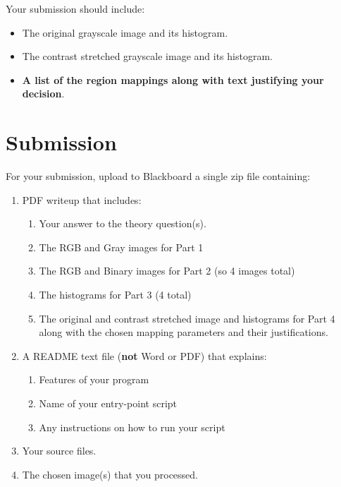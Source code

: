 \documentclass[12pt]{article}
\begin{document}
\noindent
Your submission should include:
\begin{itemize}
\item The original grayscale image and its histogram.
\item The contrast stretched grayscale image and its histogram.
\item \textbf{A list of the region mappings along with text justifying your decision}.
\end{itemize}


\newpage
\section*{Submission}
For your submission, upload to Blackboard a single zip file containing:

\begin{enumerate}
\item PDF writeup that includes:
\begin{enumerate}
\item Your answer to the theory question(s).
\item The RGB and Gray images for Part 1
\item The RGB and Binary images for Part 2 (so 4 images total)
\item The histograms for Part 3 (4 total)
\item The original and contrast stretched image and histograms for Part 4 along with the chosen mapping parameters and their justifications.
\end{enumerate}
\item A README text file (\textbf{not} Word or PDF) that explains:
\begin{enumerate}
\item Features of your program
\item Name of your entry-point script
\item Any instructions on how to run your script
\end{enumerate}
\item Your source files.
\item The chosen image(s) that you processed.
\end{enumerate}
\end{document}
